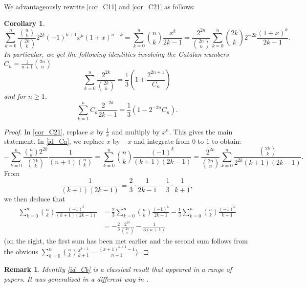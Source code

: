 \documentclass[10pt,a4paper]{amsart}
\numberwithin{equation}{section}
\newtheorem{corollary}[thm]{Corollary}
\newtheorem{remark}[thm]{Remark}
\begin{document}
We advantageously rewrite \eqref{cor_C11} and \eqref{cor_C21} as follows:

\begin{corollary}
\begin{equation}\label{id_Ca}
\sum_{k=0}^n\frac{\binom{n}{k}}{\binom{2k}{k}}2^{2k}(-1)^{k+1} x^k (1+x)^{n-k} = \sum_{k=0}^n\binom{n}{k}\frac{x^k}{2k-1}
=\frac{2^{2n}}{\binom{2n}{n}}\sum_{k=0}^n\binom{2k}{k} 2^{-2k}\frac{(1+x)^{k}}{2k-1}.
\end{equation}
In particular, we get the following identities involving the Catalan numbers $C_n=\frac{1}{n+1}\binom{2n}{n}$
\begin{equation}\label{id_Cb}
\sum_{k=0}^n \frac{2^{2k}}{\binom{2k}{k}} = \frac{1}{3} \left(1+\frac{2^{2n+1}}{C_n} \right)
\end{equation}
and for $n\ge 1$,
\begin{equation}\label{id_Cc}
\sum_{k=1}^n C_k \frac{2^{-2k}}{2k-1} = \frac{1}{3}\left( 1 - 2^{-2n} C_n \right).
\end{equation}
\end{corollary}
\begin{proof}
In \eqref{cor_C21}, replace $x$ by $\frac{1}{x}$ and multiply by $x^n$. This gives the main statement. In \eqref{id_Ca}, we replace $x$ by $-x$ and integrate from $0$ to $1$ to obtain:
\begin{equation*}%
-\sum_{k=0}^n \frac{\binom{n}{k}2^{2k}}{\binom{2k}{k}}\frac{1}{(n+1)\binom{n}{k}}
= \sum_{k=0}^n\binom{n}{k}\frac{(-1)^k}{(k+1)(2k-1)} = \frac{2^{2n}}{\binom{2n}{n}}\sum_{k=0}^n\frac{\binom{2k}{k}}{2^{2k}(k+1)(2k-1)}.
\end{equation*}
From 
$$\frac{1}{(k+1)(2k-1)} = \frac{2}{3}\cdot\frac{1}{2k-1} - \frac{1}{3}\cdot\frac{1}{k+1},$$ 
we then deduce that
\begin{align*}
\sum_{k=0}^n\binom{n}{k}\frac{(-1)^k}{(k+1)(2k-1)} &= \frac{2}{3}\sum_{k=0}^n\binom{n}{k}\frac{(-1)^k}{2k-1}-\frac{1}{3}\sum_{k=0}^n\binom{n}{k}\frac{(-1)^k}{k+1} \\
&= -\frac{2}{3}\frac{2^{2n}}{\binom{2n}{n}}-\frac{1}{3(n+1)}
\end{align*}
(on the right, the first sum has been met earlier and the second sum follows from the obvious $\sum_{k=0}^n\binom{n}{k}\frac{x^{k+1}}{k+1}=\frac{(x+1)^{n+1}-1}{n+1}$).
\end{proof}

\begin{remark}
Identity \eqref{id_Cb} is a classical result that appeared in a range of papers. It was generalized in a different way in \cite{Bataille2}.
\end{remark}
\end{document}
